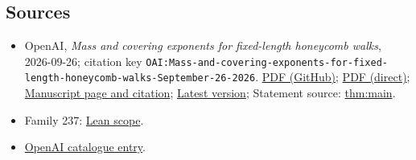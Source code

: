 \documentclass[11pt]{article}
\begin{document}
\subsection{Sources}
\begin{itemize}
\item OpenAI, \emph{Mass and covering exponents for fixed-length honeycomb walks}, 2026-09-26; citation key \texttt{OAI:Mass-and-covering-exponents-for-fixed-length-honeycomb-walks-September-26-2026}. \href{https://github.com/openai/math/blob/adc7f1241b42e322a6451854ab7e4b4c146bf78a/preprints/Mass-and-covering-exponents-for-fixed-length-honeycomb-walks-September-26-2026/main.pdf}{PDF (GitHub)}; \href{https://github.com/openai/math/raw/adc7f1241b42e322a6451854ab7e4b4c146bf78a/preprints/Mass-and-covering-exponents-for-fixed-length-honeycomb-walks-September-26-2026/main.pdf}{PDF (direct)}; \href{https://github.com/openai/math/blob/adc7f1241b42e322a6451854ab7e4b4c146bf78a/preprints/Mass-and-covering-exponents-for-fixed-length-honeycomb-walks-September-26-2026/README.md}{Manuscript page and citation}; \href{https://github.com/openai/math/blob/main/preprints/Mass-and-covering-exponents-for-fixed-length-honeycomb-walks-September-26-2026/main.pdf}{Latest version}; Statement source: \href{https://github.com/openai/math/blob/adc7f1241b42e322a6451854ab7e4b4c146bf78a/preprints/Mass-and-covering-exponents-for-fixed-length-honeycomb-walks-September-26-2026/build/sections/00\_introduction.tex\#L17}{thm:main}.
\item Family 237: \href{https://github.com/openai/math/blob/adc7f1241b42e322a6451854ab7e4b4c146bf78a/lean/docs/237.md}{Lean scope}.
\item \href{https://github.com/openai/math/blob/adc7f1241b42e322a6451854ab7e4b4c146bf78a/CONTENTS.md}{OpenAI catalogue entry}.
\end{itemize}
\end{document}
